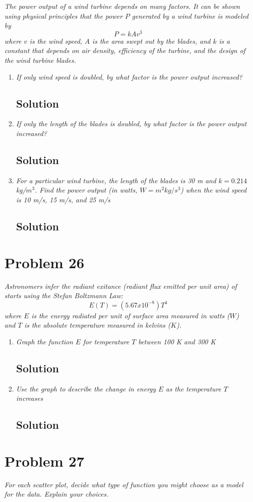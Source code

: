 \documentclass[11pt]{article}
\newcommand{\soln}{\subsection*}
\newcommand{\qn}{\textit}
\begin{document}
\qn{The power output of a wind turbine depends on many factors. It can be shown using physical principles that the power $P$ generated by a wind turbine is modeled by $$P=kAv^3$$ where $v$ is the wind speed, $A$ is the area swept out by the blades, and $k$ is a constant that depends on air density, efficiency of the turbine, and the design of the wind turbine blades.}

\begin{enumerate}
	\item \qn{If only wind speed is doubled, by what factor is the power output increased?}
	\soln{Solution}
	
	\item \qn{If only the length of the blades is doubled, by what factor is the power output increased?}
	\soln{Solution}
	
	\item \qn{For a particular wind turbine, the length of the blades is 30 m and $k=0.214$ kg/$m^3$. Find the power output (in watts, $W=m^2kg/s^3$) when the wind speed is 10 m/s, 15 m/s, and 25 m/s}
	\soln{Solution}
\end{enumerate}

\section*{Problem 26}

\qn{Astronomers infer the radiant exitance (radiant flux emitted per unit area) of starts using the Stefan Boltzmann Law: $$E(T)=(5.67 x 10^{-8})T^4$$ where $E$ is the energy radiated per unit of surface area measured in watts ($W$) and $T$ is the absolute temperature measured in kelvins ($K$).}

\begin{enumerate}
	\item \qn{Graph the function $E$ for temperature $T$ between 100 K and 300 K}
	\soln{Solution}
	
	\item \qn{Use the graph to describe the change in energy $E$ as the temperature $T$ increases}
	\soln{Solution}
\end{enumerate}

\section*{Problem 27}

\qn{For each scatter plot, decide what type of function you might choose as a model for the data. Explain your choices.}
\end{document}
